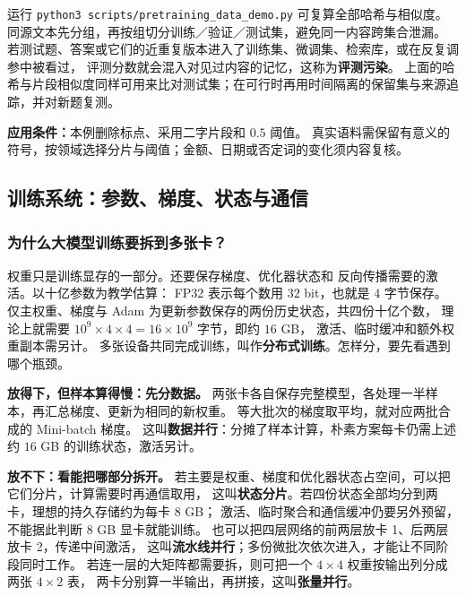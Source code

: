 运行 \texttt{python3 scripts/pretraining\_data\_demo.py} 可复算全部哈希与相似度。
同源文本先分组，再按组切分训练／验证／测试集，避免同一内容跨集合泄漏。
若测试题、答案或它们的近重复版本进入了训练集、微调集、检索库，或在反复调参中被看过，
评测分数就会混入对见过内容的记忆，这称为\textbf{评测污染}。
上面的哈希与片段相似度同样可用来比对测试集；在可行时再用时间隔离的保留集与来源追踪，并对新题复测。

\textbf{应用条件：}本例删除标点、采用二字片段和 $0.5$ 阈值。
真实语料需保留有意义的符号，按领域选择分片与阈值；金额、日期或否定词的变化须内容复核。

\subsection{训练系统：参数、梯度、状态与通信}
\subsubsection*{为什么大模型训练要拆到多张卡？}

权重只是训练显存的一部分。还要保存梯度、优化器状态和
反向传播需要的激活。以十亿参数为教学估算：
FP32 表示每个数用 $32$ bit，也就是 $4$ 字节保存。
仅主权重、梯度与 Adam 为更新参数保存的两份历史状态，共四份十亿个数，
理论上就需要 $10^9\times4\times4=16\times10^9$ 字节，即约 $16$ GB，
激活、临时缓冲和额外权重副本需另计。
多张设备共同完成训练，叫作\textbf{分布式训练}。怎样分，要先看遇到哪个瓶颈。

\textbf{放得下，但样本算得慢：先分数据。}
两张卡各自保存完整模型，各处理一半样本，再汇总梯度、更新为相同的新权重。
等大批次的梯度取平均，就对应两批合成的 Mini-batch 梯度。
这叫\textbf{数据并行}：分摊了样本计算，朴素方案每卡仍需上述约 $16$ GB 的训练状态，激活另计。

\textbf{放不下：看能把哪部分拆开。}
若主要是权重、梯度和优化器状态占空间，可以把它们分片，计算需要时再通信取用，
这叫\textbf{状态分片}。若四份状态全部均分到两卡，理想的持久存储约为每卡 $8$ GB；
激活、临时聚合和通信缓冲仍要另外预留，不能据此判断 $8$ GB 显卡就能训练。
也可以把四层网络的前两层放卡 1、后两层放卡 2，传递中间激活，
这叫\textbf{流水线并行}；多份微批次依次进入，才能让不同阶段同时工作。
若连一层的大矩阵都需要拆，则可把一个 $4\times4$ 权重按输出列分成两张 $4\times2$ 表，
两卡分别算一半输出，再拼接，这叫\textbf{张量并行}。



